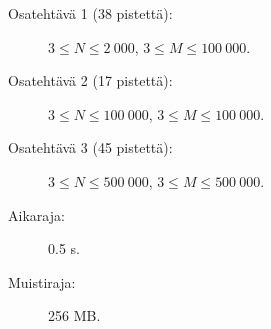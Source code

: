 \documentclass{boi2014-fi}
\begin{document}
    \Scoring

    \begin{description}
        \item[Osatehtävä 1 (38 pistettä):] $3 \le N \le 2\ 000$, $3 \le M \le 100\ 000$.
        \item[Osatehtävä 2 (17 pistettä):] $3 \le N \le 100\ 000$, $3 \le M \le 100\ 000$.
        \item[Osatehtävä 3 (45 pistettä):] $3 \le N \le 500\ 000$, $3 \le M \le 500\ 000$.
    \end{description}

    \Constraints

    \begin{description}
        \item[Aikaraja:] 0.5 s.
        \item[Muistiraja:] 256 MB.
    \end{description}
\end{document}
